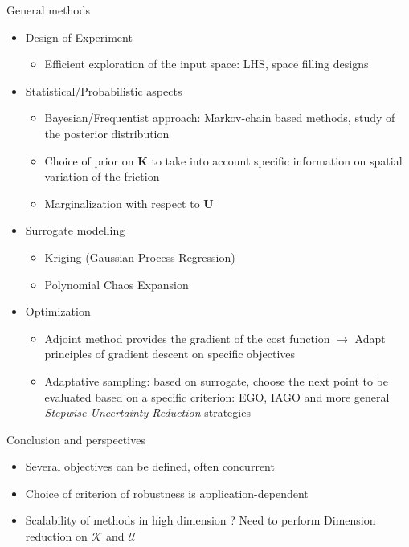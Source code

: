 \message{ !name(beamer_poster_2col.tex)}\documentclass{beamer}
\newlength{\sndcolwid}
\begin{document}
\begin{frame}[t]
\begin{columns}[t]
\begin{column}{\sndcolwid}
\begin{block}{General methods}
\begin{itemize}
  \item Design of Experiment
    \begin{itemize}
    \item Efficient exploration of the input space: LHS, space filling designs
    \end{itemize}
  \item Statistical/Probabilistic aspects
    \begin{itemize}
    \item Bayesian/Frequentist approach: Markov-chain based methods, study of the posterior distribution
    \item Choice of prior on $\bm{K}$ to take into account specific information on spatial variation of the friction
    \item Marginalization with respect to $\bm{U}$
    \end{itemize}
  \item Surrogate modelling
    \begin{itemize}
    \item Kriging (Gaussian Process Regression)
    \item Polynomial Chaos Expansion
    \end{itemize}
  \item Optimization
    \begin{itemize}
    \item Adjoint method provides the gradient of the cost function $\rightarrow$ Adapt principles of gradient descent on specific objectives
    \item Adaptative sampling: based on surrogate, choose the next point to be evaluated based on a specific criterion: EGO, IAGO and more general \emph{Stepwise Uncertainty Reduction} strategies \nocite{jones_efficient_1998}
    \end{itemize}
  \end{itemize}
\end{block}

\begin{block}{Conclusion and perspectives}
  \begin{itemize}
  \item Several objectives can be defined, often concurrent
  \item Choice of criterion of robustness is application-dependent
  \item Scalability of methods in high dimension ? Need to perform \alert{Dimension reduction} on $\mathcal{K}$ and  $\mathcal{U}$
  \end{itemize}
\end{block}


\end{column}
\end{columns}
\end{frame}
\end{document}
